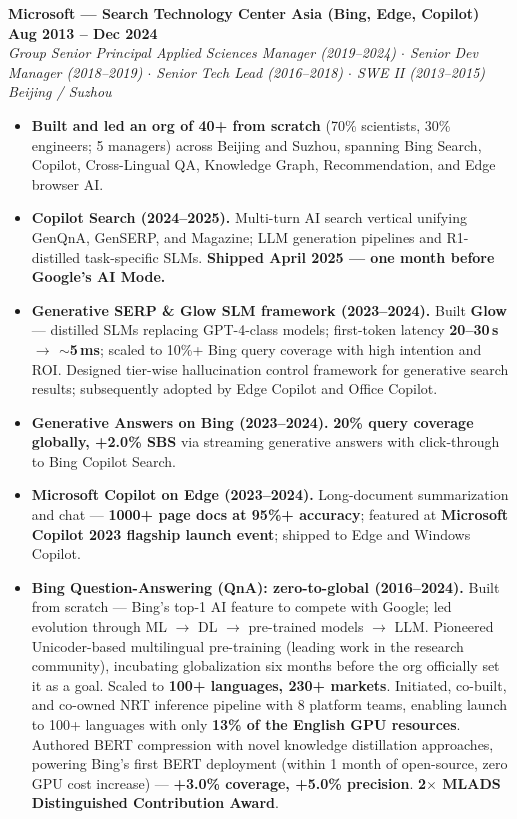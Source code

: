 \documentclass[10.5pt,letterpaper]{article}
\newcommand{\role}[4]{%
  \noindent\textbf{#1} \hfill \textbf{#3}\\
  \textit{#2} \hfill \textit{#4}\par\vspace{2pt}}
\begin{document}
\vspace{4pt}
\role{Microsoft --- Search Technology Center Asia (Bing, Edge, Copilot)}{Group Senior Principal Applied Sciences Manager (2019--2024) $\cdot$ Senior Dev Manager (2018--2019) $\cdot$ Senior Tech Lead (2016--2018) $\cdot$ SWE II (2013--2015)}{Aug 2013 -- Dec 2024}{Beijing / Suzhou}
\begin{itemize}
  \item \textbf{Built and led an org of 40+ from scratch} (70\% scientists, 30\% engineers; 5 managers) across Beijing and Suzhou, spanning Bing Search, Copilot, Cross-Lingual QA, Knowledge Graph, Recommendation, and Edge browser AI.
  \item \textbf{Copilot Search (2024--2025).} Multi-turn AI search vertical unifying GenQnA, GenSERP, and Magazine; LLM generation pipelines and R1-distilled task-specific SLMs. \textbf{Shipped April 2025 --- one month before Google's AI Mode.}
  \item \textbf{Generative SERP \& Glow SLM framework (2023--2024).} Built \textbf{Glow} --- distilled SLMs replacing GPT-4-class models; first-token latency \textbf{20--30\,s $\to$ $\sim$5\,ms}; scaled to 10\%+ Bing query coverage with high intention and ROI. Designed tier-wise hallucination control framework for generative search results; subsequently adopted by Edge Copilot and Office Copilot.
  \item \textbf{Generative Answers on Bing (2023--2024).} \textbf{20\% query coverage globally, +2.0\% SBS} via streaming generative answers with click-through to Bing Copilot Search.
  \item \textbf{Microsoft Copilot on Edge (2023--2024).} Long-document summarization and chat --- \textbf{1000+ page docs at 95\%+ accuracy}; featured at \textbf{Microsoft Copilot 2023 flagship launch event}; shipped to Edge and Windows Copilot.
  \item \textbf{Bing Question-Answering (QnA): zero-to-global (2016--2024).} Built from scratch --- Bing's top-1 AI feature to compete with Google; led evolution through ML $\to$ DL $\to$ pre-trained models $\to$ LLM. Pioneered Unicoder-based multilingual pre-training (leading work in the research community), incubating globalization six months before the org officially set it as a goal. Scaled to \textbf{100+ languages, 230+ markets}. Initiated, co-built, and co-owned NRT inference pipeline with 8 platform teams, enabling launch to 100+ languages with only \textbf{13\% of the English GPU resources}. Authored BERT compression with novel knowledge distillation approaches, powering Bing's first BERT deployment (within 1 month of open-source, zero GPU cost increase) --- \textbf{+3.0\% coverage, +5.0\% precision}. \textbf{2$\times$ MLADS Distinguished Contribution Award}.

\end{itemize}
\end{document}
